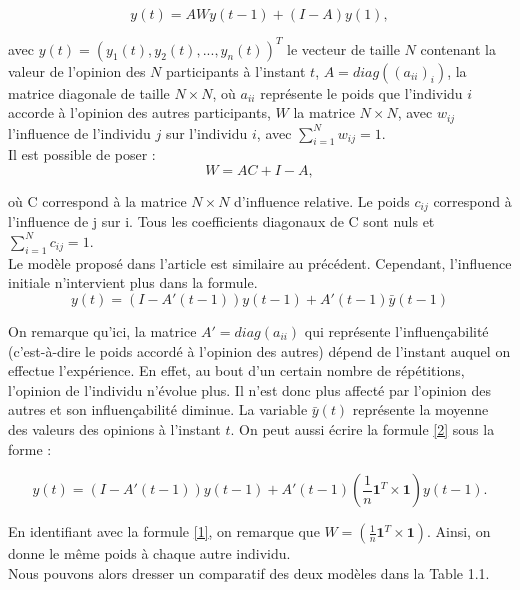 \documentclass{scrreprt}
\begin{document}
\begin{multicols}{2}
\begin{equation}
\label{1}
y(t) =AWy(t-1)+(I-A)y(1), 
\end{equation}

avec $y(t)=(y_1(t), y_2(t), ... , y_n(t))^T$ le vecteur de taille $N$ contenant la valeur de l’opinion des $N$ participants à l’instant $t$, $A=diag((a_{ii})_i)$, la matrice diagonale de taille $N\times N$, où $a_{ii}$ représente le poids que l'individu $i$ accorde à l'opinion des autres participants, $W$ la matrice $N\times N$, avec $w_{ij}$ l’influence de l’individu $j$ sur l’individu $i$, avec $\sum_{i=1}^{N} w_{ij} = 1$. \\

 Il est possible de poser :\\
\begin{equation}
\label{WC}
 W=AC+I-A,
\end{equation}

où C correspond à la matrice $N \times N$ d'influence relative. Le poids $c_{ij}$ correspond à l'influence de j sur i. Tous les coefficients diagonaux de C sont nuls et $\sum_{i=1}^{N} c_{ij} = 1$. \\

Le modèle proposé dans l'article \cite{VMG} est similaire au précédent. Cependant, l’influence initiale n'intervient plus dans la formule.\\

\begin{equation}
\label{2}
y(t) =(I-A'(t-1))y(t-1)+A'(t-1)\bar{y}(t-1) 
\end{equation}

On remarque qu’ici, la matrice $A' = diag(a_{ii})$ qui représente l'influençabilité (c'est-à-dire le poids accordé à l'opinion des autres) dépend de l’instant auquel on effectue l’expérience. En effet, au bout d'un certain nombre de répétitions, l'opinion de l'individu n'évolue plus. Il n'est donc plus affecté par l'opinion des autres et son influençabilité diminue. La variable $\bar{y}(t)$ représente la moyenne des valeurs des opinions à l’instant $t$. On peut aussi écrire la formule \eqref{2} sous la forme :

\begin{dmath}
\label{3}
y(t) = (I-A'(t-1))y(t-1) + A'(t-1)(\frac{1}{n} \textbf{1} ^T\times \textbf{1}) y(t-1).
\end{dmath}

En identifiant avec la formule \eqref{1}, on remarque que $W=(\frac{1}{n} \textbf{1} ^T\times \textbf{1})$. Ainsi, on donne le même poids à chaque autre individu.\\

Nous pouvons alors dresser un comparatif des deux modèles dans la Table 1.1.\\

\end{multicols}
\end{document}
